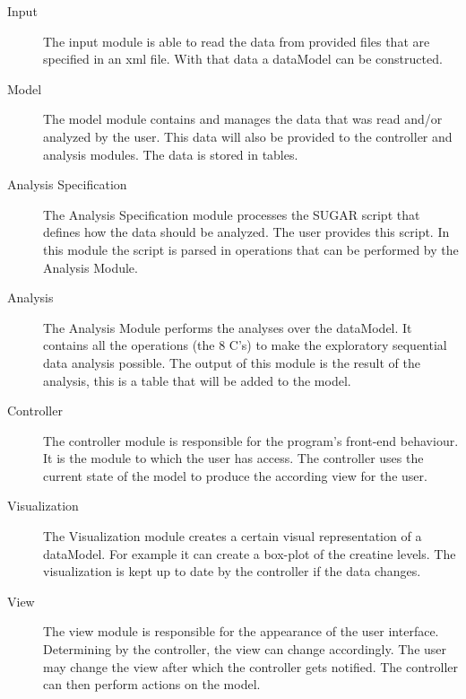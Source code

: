 \documentclass[a4paper]{article}
\begin{document}
\begin{description}
\item[Input]
The input module is able to read the data from provided files that are specified in an xml file. With that data a dataModel can be constructed.
\item[Model]
The model module contains and manages the data that was read and/or analyzed by the user. This data will also be provided to the controller and analysis modules. The data is stored in tables. 
\item[Analysis Specification]
The Analysis Specification module processes the SUGAR script that defines how the data should be analyzed. The user provides this script. In this module the script is parsed in operations that can be performed by the Analysis Module.
\item[Analysis]
The Analysis Module performs the analyses over the dataModel. It contains all the operations (the 8 C's) to make the exploratory sequential data analysis possible. The output of this module is the result of the analysis, this is a table that will be added to the model.
\item[Controller]
The controller module is responsible for the program's front-end behaviour. It is the module to which the user has access. The controller uses the current state of the model to produce the according view for the user.
\item[Visualization]
The Visualization module creates a certain visual representation of a dataModel. For example it can create a box-plot of the creatine levels. The visualization is kept up to date by the controller if the data changes.
\item[View]
The view module is responsible for the appearance of the user interface. Determining by the controller, the view can change accordingly. The user may change the view after which the controller gets notified. The controller can then perform actions on the model.

\end{description}
\end{document}
